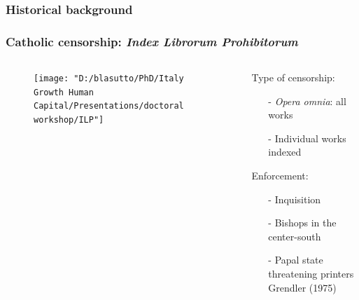 \documentclass[aspectratio=169,red,12pt]{beamer}
\begin{document}
\begin{frame}
	\frametitle{Historical background}
	\vspace{-2cm}
	\startchronology[startyear=1500,stopyear=1580,startdate=false, color=gray, stopdate=false, arrow=true, height=8pt]
	\stopchronology
	
\end{frame}

\begin{frame}
\frametitle{Catholic censorship: \textit{Index Librorum Prohibitorum}}


\begin{columns}
	
	\hspace{-0.8cm} 
	
	\begin{column}[t]{0.3\textwidth}
\begin{figure}
	\centering
	\texttt{[image: "D:/blasutto/PhD/Italy Growth Human Capital/Presentations/doctoral workshop/ILP"]}
\end{figure}
	\end{column}

\hspace{-0.8cm}

	\begin{column}[t]{0.77\textwidth}
	\vspace{-0.3cm}
	
	Type of censorship:\vspace{0.1cm}
	
	\begin{itemize}
		\item[-]\textit{Opera omnia}: all works
		\item[-] Individual works indexed\vspace{0.3cm}
	\end{itemize}
     Enforcement:\vspace{0.1cm}    
    \begin{itemize}
    	\item[-] Inquisition
    	\item[-] Bishops in the center-south 
    	\item[-] Papal state threatening printers Grendler (1975)\vspace{0.2cm}
    	

\end{itemize}
\end{column}
\end{columns}
\end{frame}
\end{document}
